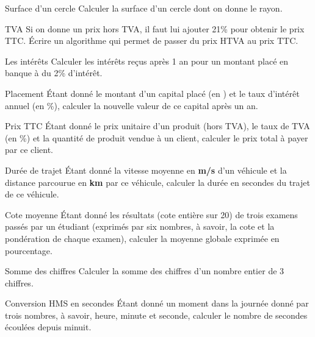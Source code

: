 		\begin{Exercice}{Surface d’un cercle}
			Calculer la surface d’un cercle dont on donne le rayon. 
		\end{Exercice}
	
		\begin{Exercice}{TVA}
			Si on donne un prix hors TVA, il faut lui ajouter 21\% 
			pour obtenir le prix TTC. Écrire un algorithme qui permet 
			de passer du prix HTVA au prix TTC.
		\end{Exercice}
	
		\begin{Exercice}{Les intérêts}
			Calculer les intérêts reçus après 1 an pour un montant placé en 
			banque à du 2\% d’intérêt.
		\end{Exercice}
	
		\begin{Exercice}{Placement}
			Étant donné le montant d’un capital placé (en \texteuro) 
			et le taux d’intérêt annuel (en \%), 
			calculer la nouvelle valeur de ce capital après un an.
		\end{Exercice}
	
		\begin{Exercice}{Prix TTC}
			Étant donné le prix unitaire d’un produit
			(hors TVA), le taux de TVA (en \%) et la quantité de produit vendue à
			un client, calculer le prix total à payer par ce client.
		\end{Exercice}
	
		\begin{Exercice}{Durée de trajet}
			Étant donné la vitesse moyenne en \textbf{m/s}
			d’un véhicule et la distance parcourue en \textbf{km} par ce véhicule,
			calculer la durée en secondes du trajet de ce véhicule.
		\end{Exercice}
	
		\begin{Exercice}{Cote moyenne}
			Étant donné les résultats (cote entière sur
			20) de trois examens passés par un étudiant (exprimés par six nombres,
			à savoir, la cote et la pondération de chaque examen), calculer 
			la moyenne globale exprimée en pourcentage.
		\end{Exercice}
	
		\begin{Exercice}{Somme des chiffres}
			Calculer la somme des chiffres
			d’un nombre entier de 3 chiffres.
		\end{Exercice}
	
		\begin{Exercice}{Conversion HMS en secondes}
			Étant donné un moment dans la journée donné
			par trois nombres, à savoir, heure, minute et seconde, calculer le
			nombre de secondes écoulées depuis minuit.
		\end{Exercice}
	
